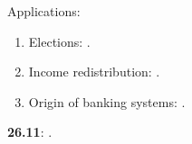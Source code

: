 \documentclass[letterpaper]{article}
\renewenvironment{itemize}{
  \begin{list}{}{
    \setlength{\leftmargin}{1.5em}
  }
}{
  \end{list}
}
\begin{document}
\begin{enumerate}
\begin{itemize}
\begin{enumerate}
          \end{enumerate}

       \item[$\diamond$] Applications:

           \begin{enumerate}


           \item[$\bullet$] Elections: \href{https://doi.org/10.1111/pops.12940}{}.


           \item[$\bullet$] Income redistribution: \href{https://doi.org/10.1111/j.1467-9221.2006.00509.x}{}.


          \item[$\bullet$] Origin of banking systems: \href{https://search.ebscohost.com/login.aspx?direct=true&db=nlebk&AN=516924&site=ehost-live&scope=site&ebv=EB&ppid=pp_88}{}.


         \end{enumerate}

       
      \end{itemize}

 \item {\bf 26.11}:  {\color{ForestGreen}{\bf Field Experiments}}.


      \begin{itemize} 


\end{itemize}
\end{enumerate}
\end{document}
